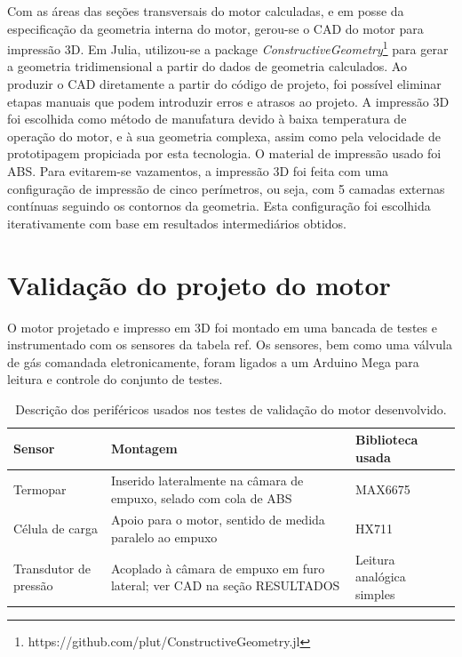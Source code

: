 Com as áreas das seções transversais do motor calculadas, e em posse da especificação da geometria interna do motor, gerou-se o CAD do motor para impressão 3D. Em Julia, utilizou-se a package \textit{ConstructiveGeometry}\footnote[1]{https://github.com/plut/ConstructiveGeometry.jl} para gerar a geometria tridimensional a partir do dados de geometria calculados. Ao produzir o CAD diretamente a partir do código de projeto, foi possível eliminar etapas manuais que podem introduzir erros e atrasos ao projeto. A impressão 3D foi escolhida como método de manufatura devido à baixa temperatura de operação do motor, e à sua geometria complexa, assim como pela velocidade de prototipagem propiciada por esta tecnologia. O material de impressão usado foi ABS\@. Para evitarem-se vazamentos, a impressão 3D foi feita com uma configuração de impressão de cinco perímetros, ou seja, com 5 camadas externas contínuas seguindo os contornos da geometria. Esta configuração foi escolhida iterativamente com base em resultados intermediários obtidos.

\section{Validação do projeto do motor}\label{sec:method_validation}

O motor projetado e impresso em 3D foi montado em uma bancada de testes e instrumentado com os sensores da tabela ref. Os sensores, bem como uma válvula de gás comandada eletronicamente, foram ligados a um Arduino Mega para leitura e controle do conjunto de testes. 


\begin{table}[htbp]
    \centering\begin{tabular}{p{}p{}p{}} \toprule
        Sensor & Montagem & Biblioteca usada \\ \midrule
        Termopar & Inserido lateralmente na câmara de empuxo, selado com cola de ABS & MAX6675 \\
        Célula de carga & Apoio para o motor, sentido de medida paralelo ao empuxo & HX711 \\
        Transdutor de pressão & Acoplado à câmara de empuxo em furo lateral; ver CAD na seção RESULTADOS & Leitura analógica simples \\ \bottomrule
    \end{tabular}
    \caption{Descrição dos periféricos usados nos testes de validação do motor desenvolvido.}\label{tab:validation_peripherals}
\end{table}

